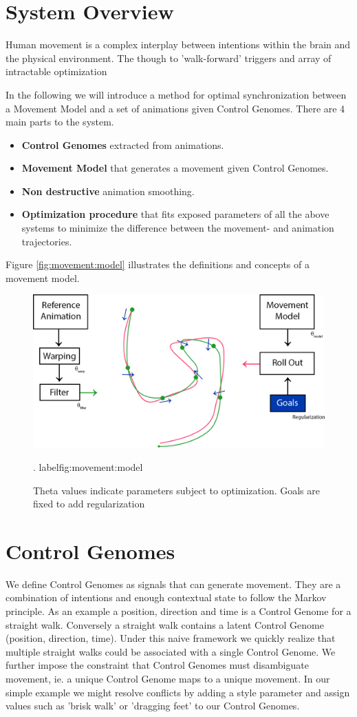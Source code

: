 \section{System Overview}
Human movement is a complex interplay between intentions within the brain and the physical environment. The though to 'walk-forward' triggers and array of intractable optimization  

In the following we will introduce a method for optimal synchronization between a Movement Model and a set of animations given Control Genomes. There are 4 main parts to the system. 
\begin{itemize}
    \item \textbf{Control Genomes} extracted from animations.
    \item \textbf{Movement Model} that generates a movement given Control Genomes.
    \item \textbf{Non destructive} animation smoothing. 
    \item \textbf{Optimization procedure} that fits exposed parameters of all the above systems to minimize the difference between the movement- and animation trajectories.
\end{itemize}
Figure \ref{fig:movement:model} illustrates the definitions and concepts of a movement model.
\begin{figure}
    \centering
    \includegraphics[width=0.75\columnwidth]{img/method-overview.png}
    \caption{Theta values indicate parameters subject to optimization. Goals are fixed to add regularization}.
    label{fig:movement:model}
\end{figure}

\section{Control Genomes}
We define Control Genomes as signals that can generate movement. They are a combination of intentions and enough contextual state to follow the Markov principle. As an example a position, direction and time is a Control Genome for a straight walk. Conversely a straight walk contains a latent Control Genome (position, direction, time). Under this naive framework we quickly realize that multiple straight walks could be associated with a single Control Genome. We further impose the constraint that Control Genomes must disambiguate movement, ie. a unique Control Genome maps to a unique movement. In our simple example we might resolve conflicts by adding a style parameter and assign values such as 'brisk walk' or 'dragging feet' to our Control Genomes. 

